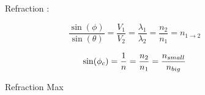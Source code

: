 \documentclass{article}
\begin{document}
\begin{figure}
\caption {Refraction : }
\centering
\[
	\frac {\sin(\phi)} {\sin(\theta)}  = \frac {V_1} {V_2} = \frac {\lambda_1} {\lambda_2} = \frac {n_2 } {n_1} = n_{1 \to 2} 
\]
\caption {Refraction Max}
\[
	\sin(\phi_c) = \frac {1} {n} = \frac {n_2} {n_1}  = \frac {n_{\space small}} {n_{\space big}}
\]
\end{figure}
\end{document}
